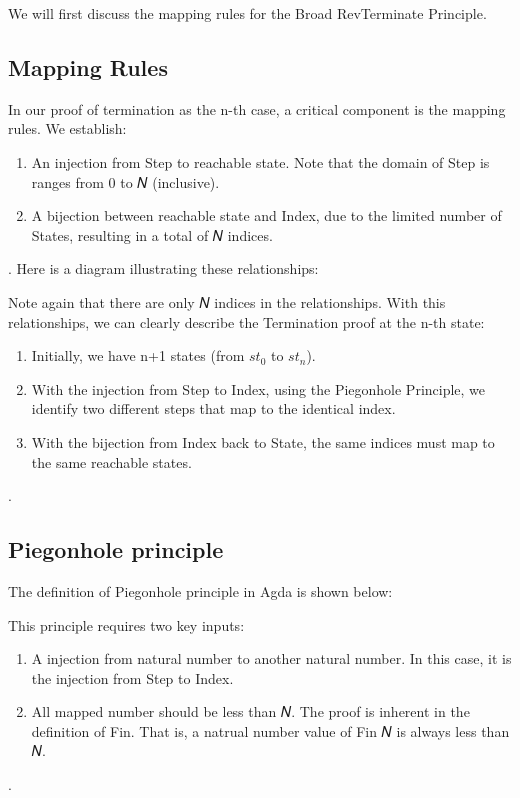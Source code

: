 We will first discuss the mapping rules for the Broad RevTerminate Principle.

\subsection{ Mapping Rules }
In our proof of termination as the n-th case, a critical component is the mapping rules.
We establish:
\begin{enumerate}[1.]
    \item An injection from Step to reachable state.  Note that the domain of Step is ranges from 0 to 𝑁 (inclusive).
    \item A bijection between reachable state and Index, due to the limited number of States, resulting in a total of 𝑁 indices.
\end{enumerate}.
Here is a diagram illustrating these relationships:


Note again that there are only 𝑁 indices in the relationships.
With this relationships, we can clearly describe the Termination proof at the n-th state:
\begin{enumerate}[1.]
    \item Initially, we have n+1 states (from $st_{0}$ to $st_{n}$).
    \item With the injection from Step to Index, using the Piegonhole Principle, we identify two different steps that map to the identical index.
    \item With the bijection from Index back to State, the same indices must map to the same reachable states.
\end{enumerate}.

\subsection{ Piegonhole principle }
The definition of Piegonhole principle in Agda is shown below:



This principle requires two key inputs:
\begin{enumerate}[1.]
    \item A injection from natural number to another natural number. In this case, it is the injection from Step to Index. 
    \item All mapped number should be less than 𝑁.  The proof is inherent in the definition of Fin.  That is, a natrual number value of Fin 𝑁 is always less than 𝑁.
\end{enumerate}.

